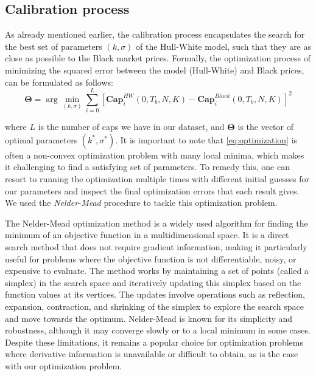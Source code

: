 \documentclass[titlepage, 12pt]{article}
\begin{document}
	\subsection{Calibration process}
	
	As already mentioned earlier, the calibration process encapsulates the search for the best set of parameters $(k,\sigma)$ of the Hull-White model, such that they are as close as possible to the Black market prices. Formally, the optimization process of minimizing the squared error between the model (Hull-White) and Black prices, can be formulated as follows:
	\begin{equation}\label{eq:optimization}
		\mathbf{\Theta} = \arg\min_{(k,\sigma)}\sum_{i=0}^L \left[\mathbf{Cap}^{HW}_i(0,T_b,N,K) - \mathbf{Cap}^{Black}_i(0,T_b,N,K)\right]^2
	\end{equation}
	
	where $L$ is the number of caps we have in our dataset, and $\mathbf{\Theta}$ is the vector of optimal parameters $(k^*,\sigma^*)$. It is important to note that \eqref{eq:optimization} is often a non-convex optimization problem with many local minima, which makes it challenging to find a satisfying set of parameters. To remedy this, one can resort to running the optimization multiple times with different initial guesses for our parameters and inspect the final optimization errors that each result gives. We used the \textit{Nelder-Mead} procedure to tackle this optimization problem. 
	
	The Nelder-Mead optimization method is a widely used algorithm for finding the minimum of an objective function in a multidimensional space. It is a direct search method that does not require gradient information, making it particularly useful for problems where the objective function is not differentiable, noisy, or expensive to evaluate. The method works by maintaining a set of points (called a simplex) in the search space and iteratively updating this simplex based on the function values at its vertices. The updates involve operations such as reflection, expansion, contraction, and shrinking of the simplex to explore the search space and move towards the optimum. Nelder-Mead is known for its simplicity and robustness, although it may converge slowly or to a local minimum in some cases. Despite these limitations, it remains a popular choice for optimization problems where derivative information is unavailable or difficult to obtain, as is the case with our optimization problem. 
	
	
\end{document}
